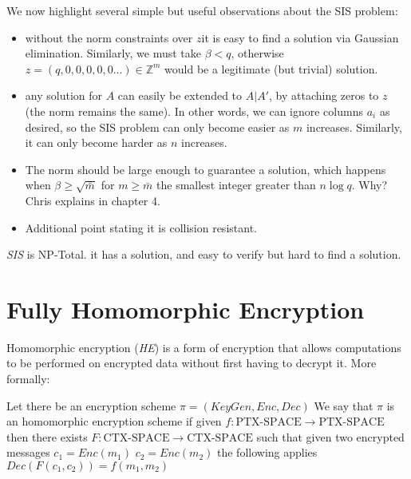 We now highlight several simple but useful observations about the SIS problem:
\begin{itemize}
    \item without the norm constraints over $z$it is easy to find a solution via Gaussian elimination. Similarly, we
must take $\beta < q$, otherwise $z=(q,0,0,0,0,0...)\in \mathbb{Z}^m$ would be a legitimate (but trivial) solution.
\item any solution for $A$ can easily be extended to $A|A'$, by attaching zeros to $z$ (the norm remains the same). In other
words, we can ignore columns $a_i$ as desired, so the SIS problem can only become easier as $m$ increases. Similarly, it can only become harder as $n$ increases.
\item The norm should be large enough to guarantee a solution, which happens when $\beta  \ge \sqrt{\bar{m}}$ for $m\ge\bar{m}$ the smallest integer greater than $n\log q$. Why? Chris explains in chapter 4.
\item Additional point stating it is collision resistant.
\end{itemize}


\emph{SIS} is NP-Total. it has a solution, and easy to verify but hard to find a solution.


%
%
%
%
\chapter{Fully Homomorphic Encryption}
Homomorphic encryption (\emph{HE}) is a form of encryption that allows 
computations to be performed on encrypted data without first having to decrypt it.
More formally:
\begin{definition}[HE]
 Let there be an encryption scheme $\pi = (KeyGen,Enc, Dec)$
 We say that $\pi$ is an homomorphic encryption scheme if
 given $f:\text{PTX-SPACE}\to \text{PTX-SPACE}$ then there
 exists $F:\text{CTX-SPACE} \to \text{CTX-SPACE}$ such that
 given two encrypted messages $c_1=Enc(m_1)$ $c_2=Enc(m_2)$ the following
 applies
   $Dec(F(c_1,c_2))=f(m_1,m_2)$
\end{definition}

